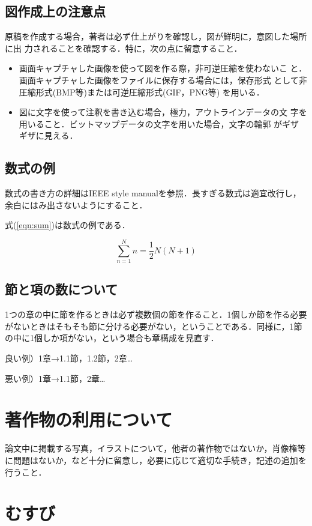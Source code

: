 \documentclass[twoside]{wiss}
\begin{document}
\subsection{図作成上の注意点}
原稿を作成する場合，著者は必ず仕上がりを確認し，図が鮮明に，意図した場所に出
力されることを確認する．特に，次の点に留意すること．
\begin{itemize}

	\item 画面キャプチャした画像を使って図を作る際，非可逆圧縮を使わないこ
	と．画面キャプチャした画像をファイルに保存する場合には，保存形式
	として非圧縮形式(BMP等)または可逆圧縮形式(GIF，PNG等) を用いる．

	\item 図に文字を使って注釈を書き込む場合，極力，アウトラインデータの文
	字を用いること．ビットマップデータの文字を用いた場合，文字の輪郭
	がギザギザに見える．
\end{itemize}

\subsection{数式の例}
数式の書き方の詳細はIEEE style manual\cite{IEEE2014}を参照．長すぎる数式は適宜改行し，余白にはみ出さないようにすること．

式(\ref{eqn:sum})は数式の例である．

\begin{equation}
	\sum^{N}_{n=1}n = \frac{1}{2}N(N+1)
	\label{eqn:sum}
\end{equation}

\subsection{節と項の数について}
1つの章の中に節を作るときは必ず複数個の節を作ること．1個しか節を作る必要がないときはそもそも節に分ける必要がない，ということである．同様に，1節の中に1個しか項がない，という場合も章構成を見直す．

良い例）1章→1.1節，1.2節，2章…

悪い例）1章→1.1節，2章…

\section{著作物の利用について}
論文中に掲載する写真，イラストについて，他者の著作物ではないか，肖像権等に問題はないか，など十分に留意し，必要に応じて適切な手続き，記述の追加を行うこと．


\section{むすび}
\end{document}
